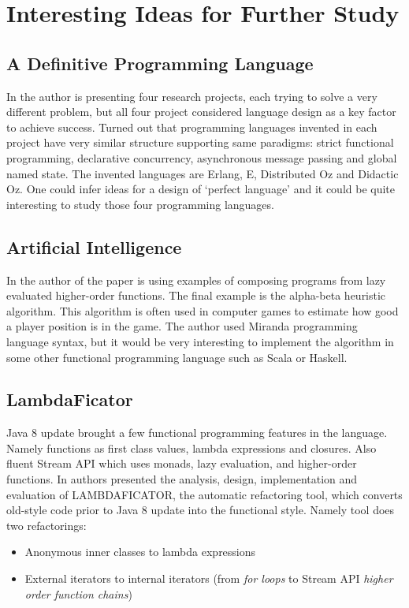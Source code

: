 \documentclass[12pt,twoside,a4paper]{report}
\begin{document}
\section{Interesting Ideas for Further Study}
\subsection{A Definitive Programming Language}
In \cite{16} the author is presenting four research projects, each trying to solve a very different problem, but all four project considered language design as a key factor to achieve success. Turned out that programming languages invented in each project have very similar structure supporting same paradigms: strict functional programming, declarative concurrency, asynchronous message passing and global named state. The invented languages are Erlang, E, Distributed Oz and Didactic Oz. One could infer ideas for a design of ‘perfect language’ and it could be quite interesting to study those four programming languages.

\subsection{Artificial Intelligence}
In \cite{14} the author of the paper is using examples of composing programs from lazy evaluated higher-order functions. The final example is the alpha-beta heuristic algorithm. This algorithm is often used in computer games to estimate how good a player position is in the game. The author used Miranda programming language syntax, but it would be very interesting to implement the algorithm in some other functional programming language such as Scala or Haskell.

\subsection{LambdaFicator}
Java 8 update brought a few functional programming features in the language. Namely functions as first class values, lambda expressions and closures. Also fluent Stream API which uses monads, lazy evaluation, and higher-order functions. In \cite{15} authors presented the analysis, design, implementation and evaluation of LAMBDAFICATOR, the automatic refactoring tool, which converts old-style code prior to Java 8 update into the functional style. Namely tool does two refactorings:

\begin{itemize}
\item Anonymous inner classes to lambda expressions
\item External iterators to internal iterators (from \textit{for loops} to Stream API \textit{higher order function chains})
\end{itemize}
\end{document}
